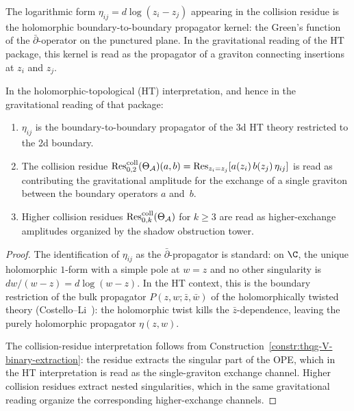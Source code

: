 \begin{proposition}
The logarithmic form $\eta_{ij} = d\log(z_i - z_j)$ appearing in
the collision residue is the holomorphic boundary-to-boundary
propagator kernel: the Green's function of the
$\bar\partial$-operator on the punctured plane. In the
gravitational reading of the HT package, this kernel is read as
the propagator of a graviton connecting insertions at $z_i$
and $z_j$.

In the holomorphic-topological (HT) interpretation, and hence in the
gravitational reading of that package:
\begin{enumerate}[label=\textup{(\roman*)}]
\item $\eta_{ij}$ is the boundary-to-boundary propagator of
 the 3d HT theory restricted to the 2d boundary.
\item The collision residue
 $\operatorname{Res}^{\mathrm{coll}}_{0,2}(\Theta_{\mathcal{A}})(a,b) =
 \operatorname{Res}_{z_i = z_j}[a(z_i)\,b(z_j)\,\eta_{ij}]$
 is read as contributing the gravitational amplitude for the
 exchange of a single graviton between the boundary operators
 $a$ and~$b$.
\item Higher collision residues
 $\operatorname{Res}^{\mathrm{coll}}_{0,k}(\Theta_{\mathcal{A}})$ for $k \geq 3$ are read as
 higher-exchange amplitudes organized by the shadow obstruction tower.
\end{enumerate}
\end{proposition}

\begin{proof}
The identification of $\eta_{ij}$ as the $\bar\partial$-propagator
is standard: on $\C$, the unique holomorphic $1$-form with a simple
pole at $w = z$ and no other singularity is
$dw/(w - z) = d\log(w - z)$. In the HT context, this is the
boundary restriction of the bulk propagator
$P(z,w;\bar{z},\bar{w})$ of the holomorphically twisted theory
(Costello--Li~\cite{CL20}): the holomorphic twist kills the
$\bar{z}$-dependence, leaving the purely holomorphic propagator
$\eta(z,w)$.

The collision-residue interpretation follows from
Construction~\ref{constr:thqg-V-binary-extraction}: the residue
extracts the singular part of the OPE, which in the HT interpretation
is read as the single-graviton exchange channel. Higher collision
residues extract nested singularities, which in the same gravitational
reading organize the corresponding higher-exchange channels.
\end{proof}


